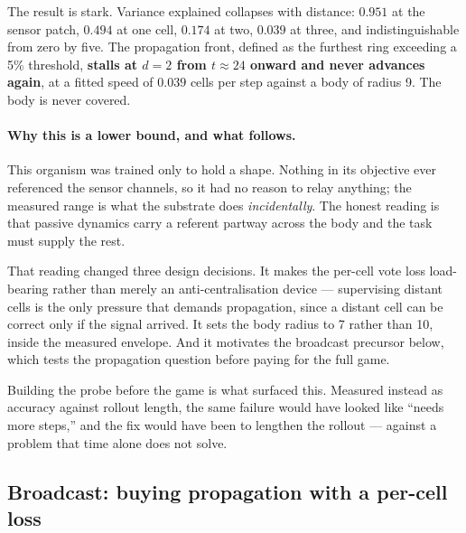 The result is stark. Variance explained collapses with distance:
$0.951$ at the sensor patch, $0.494$ at one cell, $0.174$ at two, $0.039$ at
three, and indistinguishable from zero by five. The propagation front, defined as
the furthest ring exceeding a 5\% threshold, \textbf{stalls at $d=2$ from
$t \approx 24$ onward and never advances again}, at a fitted speed of $0.039$
cells per step against a body of radius 9. The body is never covered.


\paragraph{Why this is a lower bound, and what follows.} This organism was
trained only to hold a shape. Nothing in its objective ever referenced the sensor
channels, so it had no reason to relay anything; the measured range is what the
substrate does \emph{incidentally}. The honest reading is that passive dynamics
carry a referent partway across the body and the task must supply the rest.

That reading changed three design decisions. It makes the per-cell vote loss
load-bearing rather than merely an anti-centralisation device --- supervising
distant cells is the only pressure that demands propagation, since a distant cell
can be correct only if the signal arrived. It sets the body radius to 7 rather
than 10, inside the measured envelope. And it motivates the broadcast precursor
below, which tests the propagation question before paying for the full game.

Building the probe before the game is what surfaced this. Measured instead as
accuracy against rollout length, the same failure would have looked like ``needs
more steps,'' and the fix would have been to lengthen the rollout --- against a
problem that time alone does not solve.

\subsection{Broadcast: buying propagation with a per-cell loss}
\label{sec:results-broadcast}

